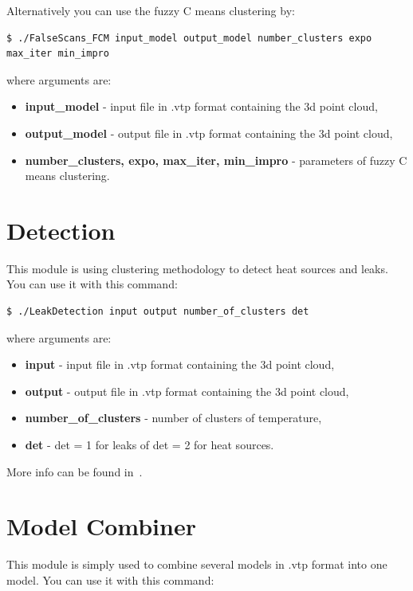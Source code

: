 \documentclass[11pt]{article} %
\begin{document}
Alternatively you can use the fuzzy C means clustering by:

\begin{verbatim}
$ ./FalseScans_FCM input_model output_model number_clusters expo max_iter min_impro
\end{verbatim}

where arguments are:
\begin{itemize}

\item \textbf{input\_model} - input file in .vtp format containing the 3d point cloud,
\item \textbf{output\_model} - output file in .vtp format containing the 3d point cloud,
\item \textbf{number\_clusters, expo, max\_iter, min\_impro} - parameters of fuzzy C means clustering.
\end{itemize}

\section{Detection}

This module is using clustering methodology to detect heat sources and leaks. You can use it with this command:

\begin{verbatim}
$ ./LeakDetection input output number_of_clusters det
\end{verbatim}

where arguments are:
\begin{itemize}

\item \textbf{input} - input file in .vtp format containing the 3d point cloud,
\item \textbf{output} - output file in .vtp format containing the 3d point cloud,
\item \textbf{number\_of\_clusters} - number of clusters of temperature,
\item \textbf{det} - det = 1 for leaks of det = 2 for heat sources.
\end{itemize}

More info can be found in~\citep{detection}.

\section{Model Combiner}

This module is simply used to combine several models in .vtp format into one model. You can use it with this command:
\end{document}
